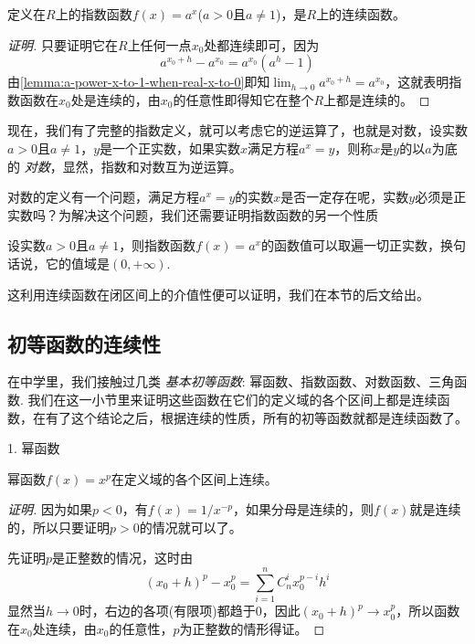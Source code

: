 \begin{theorem}
  定义在$R$上的指数函数$f(x)=a^x$($a>0$且$a \neq 1$)，是$R$上的连续函数。
\end{theorem}

\begin{proof}[证明]
  只要证明它在$R$上任何一点$x_0$处都连续即可，因为
  \[ a^{x_0+h} - a^{x_0} = a^{x_0}(a^h-1) \]
  由\autoref{lemma:a-power-x-to-1-when-real-x-to-0}即知$\lim_{h \to 0} a^{x_0+h} = a^{x_0}$，这就表明指数函数在$x_0$处是连续的，由$x_0$的任意性即得知它在整个$R$上都是连续的。
\end{proof}

现在，我们有了完整的指数定义，就可以考虑它的逆运算了，也就是对数，设实数$a>0$且$a \neq 1$，$y$是一个正实数，如果实数$x$满足方程$a^x=y$，则称$x$是$y$的以$a$为底的 \emph{对数}，显然，指数和对数互为逆运算。

对数的定义有一个问题，满足方程$a^x=y$的实数$x$是否一定存在呢，实数$y$必须是正实数吗？为解决这个问题，我们还需要证明指数函数的另一个性质
\begin{theorem}
  设实数$a>0$且$a \neq 1$，则指数函数$f(x)=a^x$的函数值可以取遍一切正实数，换句话说，它的值域是$(0,+\infty)$.
\end{theorem}

这利用连续函数在闭区间上的介值性便可以证明，我们在本节的后文给出。

\subsection{初等函数的连续性}
\label{sec:continuousness-of-elementary-function}


在中学里，我们接触过几类 \emph{基本初等函数}: 幂函数、指数函数、对数函数、三角函数. 我们在这一小节里来证明这些函数在它们的定义域的各个区间上都是连续函数，在有了这个结论之后，根据连续的性质，所有的初等函数就都是连续函数了。

1. 幂函数
\begin{theorem}
  幂函数$f(x)=x^p$在定义域的各个区间上连续。
\end{theorem}

\begin{proof}[证明]
  因为如果$p<0$，有$f(x)=1/x^{-p}$，如果分母是连续的，则$f(x)$就是连续的，所以只要证明$p>0$的情况就可以了。

  先证明$p$是正整数的情况，这时由
  \[ (x_0+h)^p-x_0^p = \sum_{i=1}^n C_n^i x_0^{p-i} h^i \]
  显然当$h \to 0$时，右边的各项(有限项)都趋于0，因此$(x_0+h)^p \to x_0^p$，所以函数在$x_0$处连续，由$x_0$的任意性，$p$为正整数的情形得证。
\end{proof}

